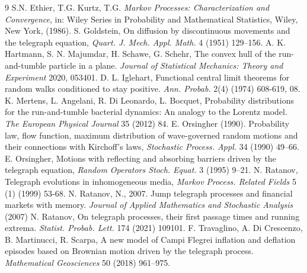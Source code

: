 \documentclass{article}
\theoremstyle{definition}
\numberwithin{equation}{section}
\begin{document}
\begin{thebibliography}{9}
S.N. Ethier, T.G. Kurtz, T.G. \textit{Markov Processes: Characterization and Convergence}, in: Wiley Series in Probability and Mathematical Statistics, Wiley, New York, (1986).
S. Goldstein, On diffusion by discontinuous movements and the telegraph equation, \textit{Quart. J. Mech. Appl. Math.} 4 (1951) 129–156.
A. K. Hartmann, S. N. Majumdar, H. Schawe, G. Schehr, The convex hull of the run-and-tumble particle in a plane. \textit{Journal of Statistical Mechanics: Theory and
Experiment} 2020, 053401.
D. L. Iglehart, Functional central limit theorems for random walks conditioned to stay positive. \textit{Ann. Probab.} 2(4) (1974) 608-619, 08.
 K. Mertens, L. Angelani, R. Di Leonardo, L. Bocquet, Probability distributions for the run-and-tumble bacterial dynamics: An analogy to the Lorentz model. \textit{The European Physical Journal} 35 (2012) 84.
E. Orsingher (1990). Probability law, flow function, maximum distribution of wave-governed random motions and their connections with Kirchoff’s laws, \textit{Stochastic Process. Appl.} 34 (1990) 49–66.
E. Orsingher, Motions with reflecting and absorbing barriers driven by the telegraph equation, \textit{Random Operators Stoch. Equat.} 3 (1995) 9–21.
N. Ratanov, Telegraph evolutions in inhomogeneous media, \textit{Markov Process. Related Fields} 5 (1) (1999) 53-68.
N. Ratanov, N., 2007. Jump telegraph processes and financial markets with memory. \textit{Journal of Applied Mathematics and Stochastic Analysis} (2007)
 N. Ratanov, On telegraph processes, their first passage times and running extrema. \textit{Statist. Probab. Lett.}  174 (2021) 109101.
F. Travaglino, A. Di Crescenzo, B. Martinucci, R. Scarpa, A new model of Campi Flegrei inflation and deflation episodes based on Brownian motion driven by the telegraph process. \textit{Mathematical Geosciences} 50 (2018) 961–975.
\end{thebibliography}
\end{document}
